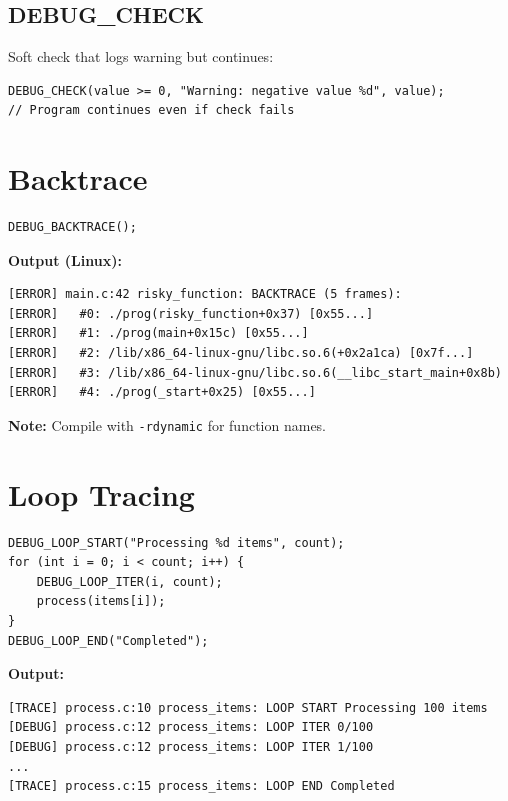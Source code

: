 \documentclass[11pt,a4paper]{article}
\begin{document}
\subsection{DEBUG\_CHECK}

Soft check that logs warning but continues:

\begin{lstlisting}
DEBUG_CHECK(value >= 0, "Warning: negative value %d", value);
// Program continues even if check fails
\end{lstlisting}

\section{Backtrace}

\begin{lstlisting}
DEBUG_BACKTRACE();
\end{lstlisting}

\textbf{Output (Linux):}
\begin{verbatim}
[ERROR] main.c:42 risky_function: BACKTRACE (5 frames):
[ERROR]   #0: ./prog(risky_function+0x37) [0x55...]
[ERROR]   #1: ./prog(main+0x15c) [0x55...]
[ERROR]   #2: /lib/x86_64-linux-gnu/libc.so.6(+0x2a1ca) [0x7f...]
[ERROR]   #3: /lib/x86_64-linux-gnu/libc.so.6(__libc_start_main+0x8b)
[ERROR]   #4: ./prog(_start+0x25) [0x55...]
\end{verbatim}

\textbf{Note:} Compile with \texttt{-rdynamic} for function names.

\section{Loop Tracing}

\begin{lstlisting}
DEBUG_LOOP_START("Processing %d items", count);
for (int i = 0; i < count; i++) {
    DEBUG_LOOP_ITER(i, count);
    process(items[i]);
}
DEBUG_LOOP_END("Completed");
\end{lstlisting}

\textbf{Output:}
\begin{verbatim}
[TRACE] process.c:10 process_items: LOOP START Processing 100 items
[DEBUG] process.c:12 process_items: LOOP ITER 0/100
[DEBUG] process.c:12 process_items: LOOP ITER 1/100
...
[TRACE] process.c:15 process_items: LOOP END Completed
\end{verbatim}
\end{document}
